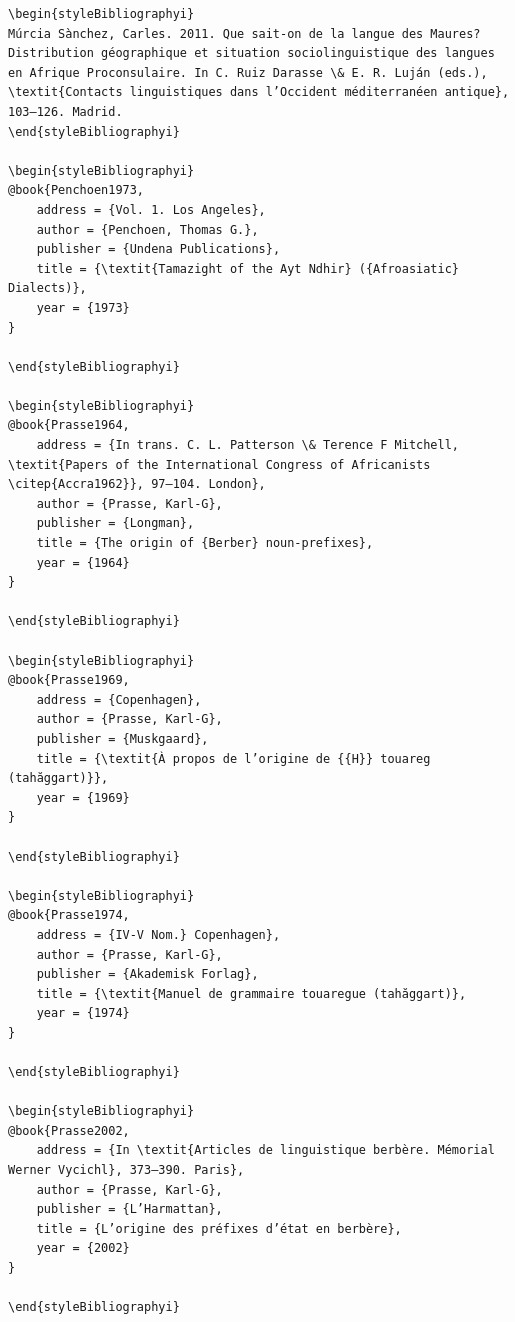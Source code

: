 \documentclass[output=paper]{langscibook}
\begin{document}
\begin{verbatim}
\begin{styleBibliographyi}
Múrcia Sànchez, Carles. 2011. Que sait-on de la langue des Maures? Distribution géographique et situation sociolinguistique des langues en Afrique Proconsulaire. In C. Ruiz Darasse \& E. R. Luján (eds.), \textit{Contacts linguistiques dans l’Occident méditerranéen antique}, 103–126. Madrid.
\end{styleBibliographyi}

\begin{styleBibliographyi}
@book{Penchoen1973,
	address = {Vol. 1. Los Angeles},
	author = {Penchoen, Thomas G.},
	publisher = {Undena Publications},
	title = {\textit{Tamazight of the Ayt Ndhir} ({Afroasiatic} Dialects)},
	year = {1973}
}

\end{styleBibliographyi}

\begin{styleBibliographyi}
@book{Prasse1964,
	address = {In trans. C. L. Patterson \& Terence F Mitchell, \textit{Papers of the International Congress of Africanists \citep{Accra1962}}, 97–104. London},
	author = {Prasse, Karl-G},
	publisher = {Longman},
	title = {The origin of {Berber} noun-prefixes},
	year = {1964}
}

\end{styleBibliographyi}

\begin{styleBibliographyi}
@book{Prasse1969,
	address = {Copenhagen},
	author = {Prasse, Karl-G},
	publisher = {Muskgaard},
	title = {\textit{À propos de l’origine de {{H}} touareg (tahăggart)}},
	year = {1969}
}

\end{styleBibliographyi}

\begin{styleBibliographyi}
@book{Prasse1974,
	address = {IV-V Nom.} Copenhagen},
	author = {Prasse, Karl-G},
	publisher = {Akademisk Forlag},
	title = {\textit{Manuel de grammaire touaregue (tahăggart)},
	year = {1974}
}

\end{styleBibliographyi}

\begin{styleBibliographyi}
@book{Prasse2002,
	address = {In \textit{Articles de linguistique berbère. Mémorial Werner Vycichl}, 373–390. Paris},
	author = {Prasse, Karl-G},
	publisher = {L’Harmattan},
	title = {L’origine des préfixes d’état en berbère},
	year = {2002}
}

\end{styleBibliographyi}


\end{verbatim}
\end{document}

